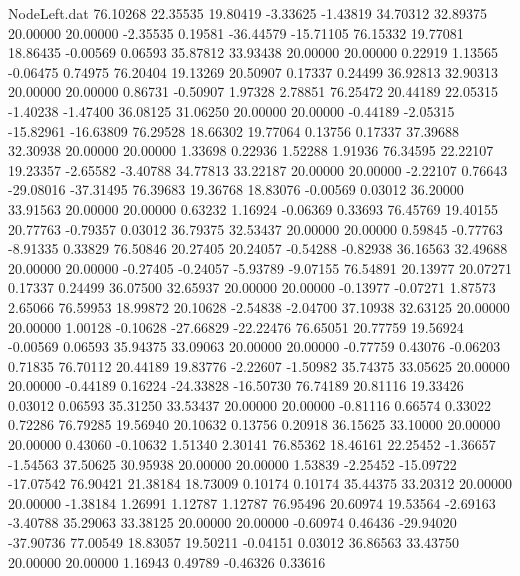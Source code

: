 \begin{filecontents}{NodeLeft.dat}
  76.10268   22.35535   19.80419    -3.33625   -1.43819   34.70312   32.89375   20.00000   20.00000   -2.35535    0.19581  -36.44579  -15.71105
  76.15332   19.77081   18.86435    -0.00569    0.06593   35.87812   33.93438   20.00000   20.00000    0.22919    1.13565   -0.06475    0.74975
  76.20404   19.13269   20.50907     0.17337    0.24499   36.92813   32.90313   20.00000   20.00000    0.86731   -0.50907    1.97328    2.78851
  76.25472   20.44189   22.05315    -1.40238   -1.47400   36.08125   31.06250   20.00000   20.00000   -0.44189   -2.05315  -15.82961  -16.63809
  76.29528   18.66302   19.77064     0.13756    0.17337   37.39688   32.30938   20.00000   20.00000    1.33698    0.22936    1.52288    1.91936
  76.34595   22.22107   19.23357    -2.65582   -3.40788   34.77813   33.22187   20.00000   20.00000   -2.22107    0.76643  -29.08016  -37.31495
  76.39683   19.36768   18.83076    -0.00569    0.03012   36.20000   33.91563   20.00000   20.00000    0.63232    1.16924   -0.06369    0.33693
  76.45769   19.40155   20.77763    -0.79357    0.03012   36.79375   32.53437   20.00000   20.00000    0.59845   -0.77763   -8.91335    0.33829
  76.50846   20.27405   20.24057    -0.54288   -0.82938   36.16563   32.49688   20.00000   20.00000   -0.27405   -0.24057   -5.93789   -9.07155
  76.54891   20.13977   20.07271     0.17337    0.24499   36.07500   32.65937   20.00000   20.00000   -0.13977   -0.07271    1.87573    2.65066
  76.59953   18.99872   20.10628    -2.54838   -2.04700   37.10938   32.63125   20.00000   20.00000    1.00128   -0.10628  -27.66829  -22.22476
  76.65051   20.77759   19.56924    -0.00569    0.06593   35.94375   33.09063   20.00000   20.00000   -0.77759    0.43076   -0.06203    0.71835
  76.70112   20.44189   19.83776    -2.22607   -1.50982   35.74375   33.05625   20.00000   20.00000   -0.44189    0.16224  -24.33828  -16.50730
  76.74189   20.81116   19.33426     0.03012    0.06593   35.31250   33.53437   20.00000   20.00000   -0.81116    0.66574    0.33022    0.72286
  76.79285   19.56940   20.10632     0.13756    0.20918   36.15625   33.10000   20.00000   20.00000    0.43060   -0.10632    1.51340    2.30141
  76.85362   18.46161   22.25452    -1.36657   -1.54563   37.50625   30.95938   20.00000   20.00000    1.53839   -2.25452  -15.09722  -17.07542
  76.90421   21.38184   18.73009     0.10174    0.10174   35.44375   33.20312   20.00000   20.00000   -1.38184    1.26991    1.12787    1.12787
  76.95496   20.60974   19.53564    -2.69163   -3.40788   35.29063   33.38125   20.00000   20.00000   -0.60974    0.46436  -29.94020  -37.90736
  77.00549   18.83057   19.50211    -0.04151    0.03012   36.86563   33.43750   20.00000   20.00000    1.16943    0.49789   -0.46326    0.33616

\end{filecontents}

